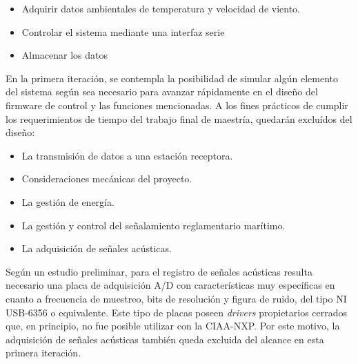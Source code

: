 \begin{itemize}
	\item Adquirir datos ambientales de temperatura y velocidad de viento.
	\item Controlar el sistema mediante una interfaz serie
	\item Almacenar los datos 
\end{itemize}

En la primera iteración, se contempla la posibilidad de simular algún elemento del sistema según sea necesario para avanzar rápidamente en el diseño del firmware de control y las funciones mencionadas. A los fines prácticos de cumplir los requerimientos de tiempo del trabajo final de maestría, quedarán excluídos del diseño:

\begin{itemize}
	\item La transmisión de datos a una estación receptora.
	\item Consideraciones mecánicas del proyecto.
	\item La gestión de energía.
	\item La gestión y control del señalamiento reglamentario marítimo.
	\item La adquisición de señales acústicas.
\end{itemize}

Según un estudio preliminar, para el registro de señales acústicas resulta necesario una placa de adquisición A/D con características muy específicas en cuanto a frecuencia de muestreo, bits de resolución y figura de ruido, del tipo NI USB-6356 o equivalente.  Este tipo de placas poseen \textit{drivers} propietarios cerrados que, en principio, no fue posible utilizar con la CIAA-NXP.   Por este motivo, la adquisición de señales acústicas también queda excluida del alcance en esta primera iteración.







